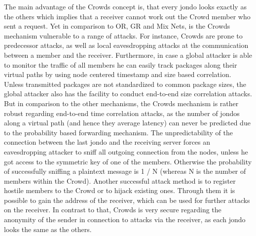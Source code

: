 \documentclass{sig-alternate}
\begin{document}
The main advantage of the Crowds concept is, that every jondo looks exactly as the others which implies that a receiver cannot work out the Crowd member who sent a request. Yet in comparison to OR, GR and Mix Nets, is the Crowds mechanism vulnerable to a range of attacks. For instance, Crowds are prone to predecessor attacks, as well as local eavesdropping attacks at the communication between a member and the receiver. Furthermore, in case a global attacker is able to monitor the traffic of all members he can easily track packages along their virtual paths by using node centered timestamp and size based correlation. Unless transmitted packages are not standardized to common package sizes, the global attacker also has the facility to conduct end-to-end size correlation attacks. But in comparison to the other mechanisms, the Crowds mechanism is rather robust regarding end-to-end time correlation attacks, as the number of jondos along a virtual path (and hence they average latency) can never be predicted due to the probability based forwarding mechanism. The unpredictability of the connection between the last jondo and the receiving server forces an eavesdropping attacker to sniff all outgoing connection from the nodes, unless he got access to the symmetric key of one of the members. Otherwise the probability of successfully sniffing a plaintext message is 1 / N (whereas N is the number of members within the Crowd). Another successful attack method is to register hostile members to the Crowd or to hijack existing ones. Through them it is possible to gain the address of the receiver, which can be used for further attacks on the receiver. In contrast to that, Crowds is very secure regarding the anonymity of the sender in connection to attacks via the receiver, as each jondo looks the same as the others. 
\end{document}
